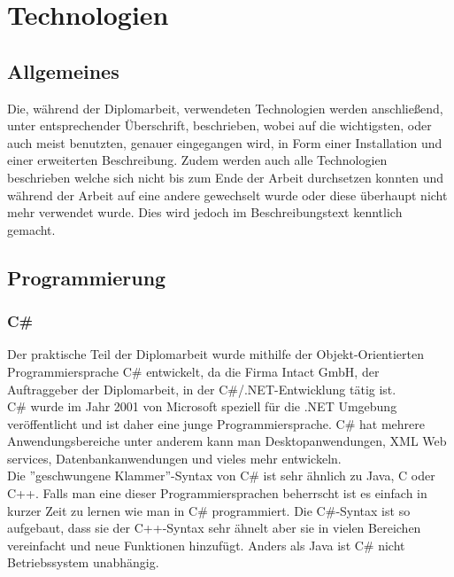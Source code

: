 \renewcommand{\theauthor}{Dario Wagner}
\section{Technologien}
\label{sec:Technologien}
\subsection{Allgemeines}
\label{sec:TechnologieAllgemeines}
Die, während der Diplomarbeit, verwendeten Technologien werden anschließend, unter entsprechender Überschrift, beschrieben, wobei auf die wichtigsten, oder auch meist benutzten, genauer eingegangen wird, in Form einer Installation und einer erweiterten Beschreibung. Zudem werden auch alle Technologien beschrieben welche sich nicht bis zum Ende der Arbeit durchsetzen konnten und während der Arbeit auf eine andere gewechselt wurde oder diese überhaupt nicht mehr verwendet wurde. Dies wird jedoch im Beschreibungstext kenntlich gemacht.
\subsection{Programmierung}
\label{sec:TechnologieProgrammierung}
\subsubsection {C\#}
\label{sec:CSharp}
Der praktische Teil der Diplomarbeit wurde mithilfe der Objekt-Orientierten Programmiersprache C\# entwickelt, da die Firma Intact GmbH, der Auftraggeber der Diplomarbeit, in der C\#/.NET-Entwicklung tätig ist. \\ \break
C\# wurde im Jahr 2001 von Microsoft speziell für die .NET Umgebung veröffentlicht und ist daher eine junge Programmiersprache. C\# hat mehrere Anwendungsbereiche unter anderem kann man Desktopanwendungen, XML Web services, Datenbankanwendungen und vieles mehr entwickeln. \\ \break
Die ''geschwungene Klammer''-Syntax von C\# ist sehr ähnlich zu Java, C oder C++. Falls man eine dieser Programmiersprachen beherrscht ist es einfach in kurzer Zeit zu lernen wie man in C\# programmiert. Die C\#-Syntax ist so aufgebaut, dass sie der C++-Syntax sehr ähnelt aber sie in vielen Bereichen vereinfacht und neue Funktionen hinzufügt. Anders als Java ist C\# nicht Betriebssystem unabhängig.
\cite{TechnologieCSharpErklaerung} 

